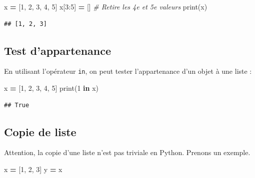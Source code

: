 \documentclass[
  12pt,
]{book}
\newenvironment{Shaded}{\begin{snugshade}}{\end{snugshade}}
\newcommand{\BuiltInTok}[1]{#1}
\newcommand{\CommentTok}[1]{\textcolor[rgb]{0.56,0.35,0.01}{\textit{#1}}}
\newcommand{\DecValTok}[1]{\textcolor[rgb]{0.00,0.00,0.81}{#1}}
\newcommand{\KeywordTok}[1]{\textcolor[rgb]{0.13,0.29,0.53}{\textbf{#1}}}
\newcommand{\NormalTok}[1]{#1}
\newcommand{\OperatorTok}[1]{\textcolor[rgb]{0.81,0.36,0.00}{\textbf{#1}}}
\numberwithin{equation}{section}
\numberwithin{countremarque}{section}
\begin{document}
\begin{Shaded}
\begin{Highlighting}[]
\NormalTok{x }\OperatorTok{=}\NormalTok{ [}\DecValTok{1}\NormalTok{, }\DecValTok{2}\NormalTok{, }\DecValTok{3}\NormalTok{, }\DecValTok{4}\NormalTok{, }\DecValTok{5}\NormalTok{]}
\NormalTok{x[}\DecValTok{3}\NormalTok{:}\DecValTok{5}\NormalTok{] }\OperatorTok{=}\NormalTok{ [] }\CommentTok{\# Retire les 4e et 5e valeurs}
\BuiltInTok{print}\NormalTok{(x)}
\end{Highlighting}
\end{Shaded}

\begin{lstlisting}
## [1, 2, 3]
\end{lstlisting}

\subsection{Test d'appartenance}\label{test-dappartenance}

En utilisant l'opérateur \texttt{in}, on peut tester l'appartenance d'un objet à une liste :

\begin{Shaded}
\begin{Highlighting}[]
\NormalTok{x }\OperatorTok{=}\NormalTok{ [}\DecValTok{1}\NormalTok{, }\DecValTok{2}\NormalTok{, }\DecValTok{3}\NormalTok{, }\DecValTok{4}\NormalTok{, }\DecValTok{5}\NormalTok{]}
\BuiltInTok{print}\NormalTok{(}\DecValTok{1} \KeywordTok{in}\NormalTok{ x)}
\end{Highlighting}
\end{Shaded}

\begin{lstlisting}
## True
\end{lstlisting}

\subsection{Copie de liste}\label{copie-de-liste}

Attention, la copie d'une liste n'est pas triviale en Python. Prenons un exemple.

\begin{Shaded}
\begin{Highlighting}[]
\NormalTok{x }\OperatorTok{=}\NormalTok{ [}\DecValTok{1}\NormalTok{, }\DecValTok{2}\NormalTok{, }\DecValTok{3}\NormalTok{]}
\NormalTok{y }\OperatorTok{=}\NormalTok{ x}
\end{Highlighting}
\end{Shaded}
\end{document}
